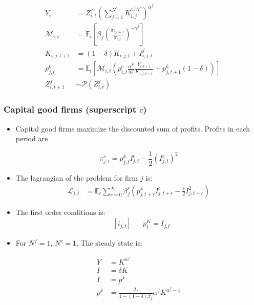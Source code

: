 \documentclass[11pt]{article}
\newcommand{\E}{\mathbb{E}}
\numberwithin{equation}{section}
\begin{document}
\begin{itemize}
\begin{itemize}
		\begin{align}
		Y_i & = Z^f_{i,t} \left( \sum_{j=1}^{N^c } K^{1/N^c}_{i,j}\right)^{\alpha^f} \\
		\mathcal{M}_{i,t} & = \E_t \left[ \beta_f \left(\frac{\pi_{i,t+1}}{\pi_{i,t}}\right)^{-\gamma^f} \right] \\
		K_{i,j,t+1} & = (1-\delta) K_{i,j,t} + I^f_{i,j,t} \\
		p^k_{j,t} & =\E_t  \left[\mathcal{M}_{i,t} \left( p^c_{i,t} \frac{\alpha^F}{N^f} \frac{Y_{i,t+1}}{K_{i,j,t+1}} +  p^k_{j,t+1} (1-\delta) \right) \right] \\
		Z^f_{i,t+1} & \sim \mathcal{P}(Z^f_{i,t})
		\end{align}
		
	\end{itemize}
	
	\subsubsection{Capital good firms (superscript $c$)}
	
	
	\begin{itemize}
		
		\item Capital good firms maximize the discounted sum of profits. Profits in each period are
		
		$$\pi^c_{j,t}=p^k_{j,t} I^c_{j,t}-\frac{1}{2} \left(I^c_{j,t}\right)^2  $$
		
		
		\item The lagrangian of the problem for firm $j$ is:
		\begin{align*}
		\mathcal{L}_{j,t} &= \E_t \sum_{r=0}^{\infty}\beta^r_f \left(
		p^k_{j,t+r} I^c_{j,t+r}-\frac{1}{2} I^2_{j,t+r} \right)
		\end{align*}
		
		\item The first order conditions is:
		\begin{align}
		& \left[i_{j,t}\right]&& p^K_{t} = I_{j,t}
		\end{align}
		
		
		\item  For $N^f=1$, $N^c=1$, The steady state is:
		
		\begin{align*}
		Y & =  	K^{\alpha^f}  \\
		I & = \delta K\\
		I & = p^k \\  
		p^k & =\frac{\beta_f}{1-(1-\delta)\beta_f}  \alpha^f K^{\alpha^f-1}  \\ 
		\end{align*}
		

\end{itemize}
\end{itemize}
\end{document}
